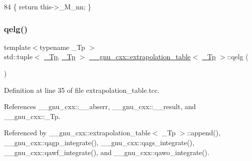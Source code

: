 \begin{DoxyCode}
84       \{ \textcolor{keywordflow}{return} this->\_M\_nn; \}
\end{DoxyCode}
\mbox{\label{class____gnu__cxx_1_1extrapolation__table_a8bacdbca35a9df35185102710380a8ec}} 
\subsubsection{\texorpdfstring{qelg()}{qelg()}}
{\footnotesize\ttfamily template$<$typename \+\_\+\+Tp $>$ \\
std\+::tuple$<$ \hyperlink{namespace____gnu__cxx_a3b19a9c800ca194374ef9172290f7d79}{\+\_\+\+Tp}, \hyperlink{namespace____gnu__cxx_a3b19a9c800ca194374ef9172290f7d79}{\+\_\+\+Tp} $>$ \hyperlink{class____gnu__cxx_1_1extrapolation__table}{\+\_\+\+\_\+gnu\+\_\+cxx\+::extrapolation\+\_\+table}$<$ \hyperlink{namespace____gnu__cxx_a3b19a9c800ca194374ef9172290f7d79}{\+\_\+\+Tp} $>$\+::qelg (\begin{DoxyParamCaption}{ }\end{DoxyParamCaption})}



Definition at line 35 of file extrapolation\+\_\+table.\+tcc.



References \+\_\+\+\_\+gnu\+\_\+cxx\+::\+\_\+\+\_\+abserr, \+\_\+\+\_\+gnu\+\_\+cxx\+::\+\_\+\+\_\+result, and \+\_\+\+\_\+gnu\+\_\+cxx\+::\+\_\+\+Tp.



Referenced by \+\_\+\+\_\+gnu\+\_\+cxx\+::extrapolation\+\_\+table$<$ \+\_\+\+Tp $>$\+::append(), \+\_\+\+\_\+gnu\+\_\+cxx\+::qagp\+\_\+integrate(), \+\_\+\+\_\+gnu\+\_\+cxx\+::qags\+\_\+integrate(), \+\_\+\+\_\+gnu\+\_\+cxx\+::qawf\+\_\+integrate(), and \+\_\+\+\_\+gnu\+\_\+cxx\+::qawo\+\_\+integrate().


